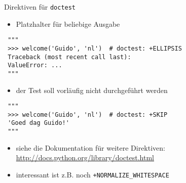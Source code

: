 \documentclass[t, utf8x, 10pt]{beamer}
\begin{document}
\begin{frame}[fragile]{Direktiven für \texttt{doctest}}
 \begin{itemize}
  \item Platzhalter für beliebige Ausgabe
 \end{itemize}
 \begin{footnotesize}
  \begin{lstlisting}
 """
 >>> welcome('Guido', 'nl')  # doctest: +ELLIPSIS
 Traceback (most recent call last):
 ValueError: ...
 """
  \end{lstlisting}
 \end{footnotesize}

 \begin{itemize}
  \item der Test soll vorläufig nicht durchgeführt werden
 \end{itemize}
 \begin{footnotesize}
  \begin{lstlisting}
 """
 >>> welcome('Guido', 'nl')  # doctest: +SKIP
 'Goed dag Guido!'
 """
  \end{lstlisting}
 \end{footnotesize}

 \begin{itemize}
  \item siehe die Dokumentation für weitere Direktiven:
	\url{http://docs.python.org/library/doctest.html}
  \item interessant ist z.B. noch \texttt{+NORMALIZE\_WHITESPACE}
 \end{itemize}
\end{frame}
\end{document}

